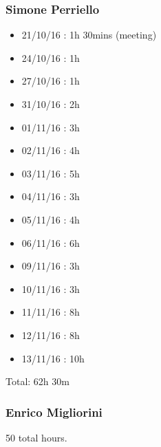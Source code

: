 \subsubsection{Simone Perriello}
\begin{itemize}
\item21/10/16 : 1h 30mins (meeting)
\item24/10/16 : 1h 
\item27/10/16 : 1h
\item31/10/16 : 2h 
\item01/11/16 : 3h
\item02/11/16 : 4h
\item03/11/16 : 5h
\item04/11/16 : 3h
\item05/11/16 : 4h
\item06/11/16 : 6h
\item09/11/16 : 3h
\item10/11/16 : 3h
\item11/11/16 : 8h
\item12/11/16 : 8h
\item13/11/16 : 10h 
\end{itemize}
Total: 62h 30m

\subsubsection{Enrico Migliorini}
50 total hours.